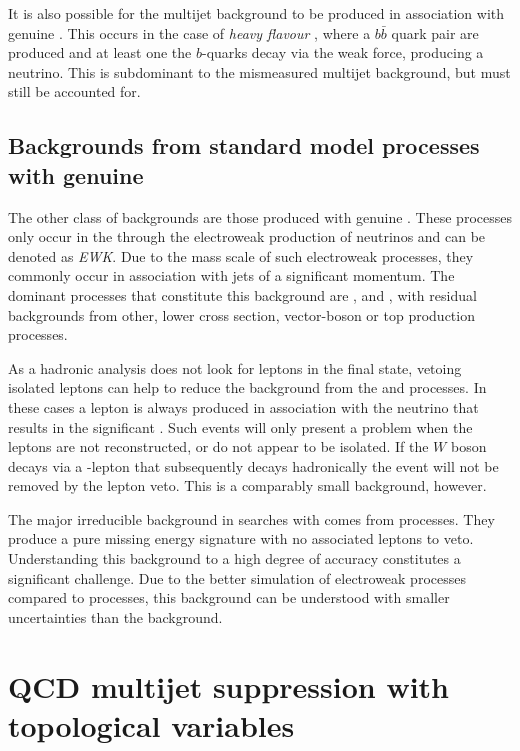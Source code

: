 It is also possible for the \QCD multijet background to be produced in
association with genuine \MET. This occurs in the case of \emph{heavy
flavour} \QCD, where a $b\bar{b}$ quark pair are produced and at least
one the $b$-quarks decay via the weak force, producing a neutrino.
This is subdominant to the mismeasured multijet background, but must
still be accounted for. 


\subsection{Backgrounds from standard model processes with genuine
\MET}

The other class of \SM backgrounds are those produced with genuine
\MET. These processes only occur in the \SM through the electroweak
production of neutrinos and can be denoted as \emph{EWK}. Due to the
mass scale of such electroweak processes, they commonly occur in
association with jets of a significant momentum. The dominant
processes that constitute this background are \wj, \znunu and \ttbar,
with residual backgrounds from other, lower cross section,
vector-boson or top production processes.

As a hadronic analysis does not look for leptons in the final state,
vetoing isolated leptons can help to reduce the background from the
\wj and \ttbar processes. In these cases a lepton is always produced
in association with the neutrino that results in the significant \MET.
Such events will only present a problem when the leptons are not
reconstructed, or do not appear to be isolated.  If the $W$ boson
decays via a \tau-lepton that subsequently decays hadronically the
event will not be removed by the lepton veto.  This is a comparably
small background, however.

The major irreducible background in \BSM searches with \MET comes from 
\znunu processes. They produce a pure missing energy signature with no
associated leptons to veto. Understanding this background to a high
degree of accuracy constitutes a significant challenge. Due to the
better simulation of electroweak processes compared to \QCD processes,
this background can be understood with smaller uncertainties than the
\QCD background.

\section{QCD multijet suppression with topological variables} %
\label{sec:challenge}

